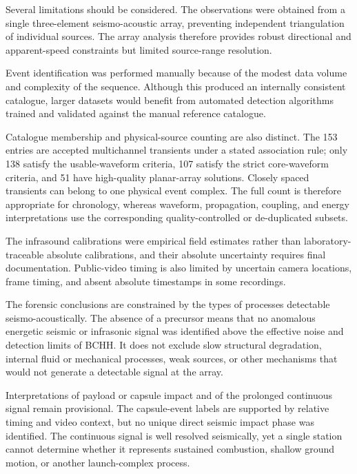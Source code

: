 \documentclass[]{seismica}
\begin{document}
Several limitations should be considered. The observations were obtained from a single three-element seismo-acoustic array, preventing independent triangulation of individual sources. The array analysis therefore provides robust directional and apparent-speed constraints but limited source-range resolution.


Event identification was performed manually because of the modest data volume and complexity of the sequence. Although this produced an internally consistent catalogue, larger datasets would benefit from automated detection algorithms trained and validated against the manual reference catalogue.

Catalogue membership and physical-source counting are also distinct. The 153
entries are accepted multichannel transients under a stated association rule;
only 138 satisfy the usable-waveform criteria, 107 satisfy the strict
core-waveform criteria, and 51 have high-quality planar-array solutions.
Closely spaced transients can belong to one physical event complex. The full
count is therefore appropriate for chronology, whereas waveform, propagation,
coupling, and energy interpretations use the corresponding quality-controlled
or de-duplicated subsets.

The infrasound calibrations were empirical field estimates rather than
laboratory-traceable absolute calibrations, and their absolute uncertainty
requires final documentation. Public-video timing is also limited by uncertain
camera locations, frame timing, and absent absolute timestamps in some
recordings.

The forensic conclusions are constrained by the types of processes detectable
seismo-acoustically. The absence of a precursor means that no anomalous
energetic seismic or infrasonic signal was identified above the effective noise
and detection limits of BCHH. It does not exclude slow structural degradation,
internal fluid or mechanical processes, weak sources, or other mechanisms that
would not generate a detectable signal at the array.

Interpretations of payload or capsule impact and of the prolonged continuous
signal remain provisional. The capsule-event labels are supported by relative
timing and video context, but no unique direct seismic impact phase was
identified. The continuous signal is well resolved seismically, yet a single
station cannot determine whether it represents sustained combustion, shallow
ground motion, or another launch-complex process.
\end{document}
